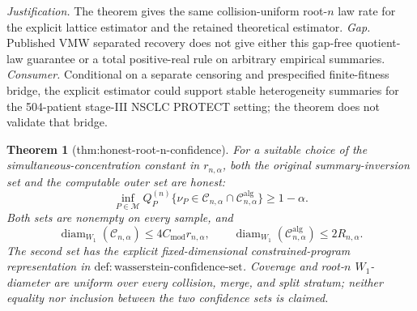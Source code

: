 \documentclass{article}
\newtheorem{theorem}{Theorem}
\begin{document}
\par\smallskip\noindent \textit{Justification.} The theorem gives the same collision-uniform root-\(n\) law rate for the explicit lattice estimator and the retained theoretical estimator. \textit{Gap.} Published VMW separated recovery does not give either this gap-free quotient-law guarantee or a total positive-real rule on arbitrary empirical summaries. \textit{Consumer.} Conditional on a separate censoring and prespecified finite-fitness bridge, the explicit estimator could support stable heterogeneity summaries for the 504-patient stage-III NSCLC PROTECT setting; the theorem does not validate that bridge.

\begin{theorem}[thm:honest-root-n-confidence]\label{thm:honest-root-n-confidence}
For a suitable choice of the simultaneous-concentration constant in \(r_{n,\alpha}\), both the original summary-inversion set and the computable outer set are honest:
\[
\inf_{P\in\mathcal M}Q_P^{(n)}\{
\nu_P\in\mathcal C_{n,\alpha}\cap\mathcal C^{\mathrm{alg}}_{n,\alpha}\}
\ge1-\alpha.
\]
Both sets are nonempty on every sample, and
\[
\operatorname{diam}_{W_1}(\mathcal C_{n,\alpha})
\le4C_{\mathrm{mod}}r_{n,\alpha},
\qquad
\operatorname{diam}_{W_1}(\mathcal C^{\mathrm{alg}}_{n,\alpha})
\le2R_{n,\alpha}.
\]
The second set has the explicit fixed-dimensional constrained-program representation in \(\mathrm{def:wasserstein\text{-}confidence\text{-}set}\).  Coverage and root-\(n\) \(W_1\)-diameter are uniform over every collision, merge, and split stratum; neither equality nor inclusion between the two confidence sets is claimed.
\end{theorem}
\end{document}
